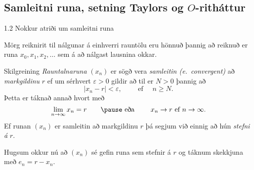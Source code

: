\subsection{Samleitni runa, setning Taylors og $O$-ritháttur}
\begin{frame}{1.2 Nokkur atriði um samleitni runa} 

Mörg reiknirit til nálgunar á einhverri rauntölu eru hönnuð þannig að 
reiknuð er runa $x_0,x_1,x_2,\dots$ sem á að nálgast lausnina
okkar.\pause

\begin{block}{Skilgreining}
{\it Rauntalnaruna} $(x_n)$ er sögð vera {\it samleitin \emph{(e.~convergent)}} að {\it
  markgildinu} $r$ ef um sérhvert $\varepsilon>0$ gildir að til er
$N>0$ þannig að  
\begin{equation*}
	|x_n-r|<\varepsilon, \qquad \text{ ef } \quad n\geq N.
\end{equation*}\pause
Þetta er táknað annað hvort með
\begin{equation*}
	\lim_{n\to \infty}x_n=r \qquad \pause\text{ eða } \qquad  x_n\to r
	\text{ ef } n\to \infty.
\end{equation*} \pause
Ef runan $(x_n)$ er samleitin að markgildinu $r$ þá segjum við einnig
að hún {\it stefni á} $r$. 
\end{block}

\pause
Hugsum okkur nú að $(x_n)$ sé gefin runa sem stefnir á $r$ og táknum
skekkjuna með $e_n=r-x_n$.
\end{frame}
%

